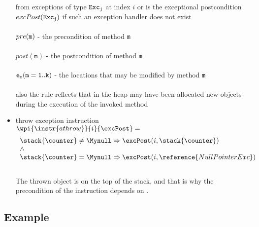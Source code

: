 \begin{itemize}
							from exceptions of type $\tt{Exc_j}$ at index $i$ or is the exceptional postcondition $excPost( \tt{Exc_j} )$ 
							if such an exception handler does not exist \\	\\
	 				 		$pre( \tt{m})$ - the precondition of method \texttt{m} \\ \\
	 				 		$ post( \texttt{m} )$ - the postcondition of method \texttt{m} \\ \\
	 				 		$\tt{e_m}( m =1 .. k  )  $ - the locations that may be modified by method  \texttt{m}  \\ \\
							also the rule reflects that in the heap may have been allocated new objects during the execution of the invoked method
						

\item throw exception instruction \\
				
							$ \wpi{\instr{athrow }} {i} {\excPost}  =$
							$$ \begin{array}{l} 
								\stack{\counter} \neq \Mynull \Rightarrow  \excPost( i, \stack{\counter}) \\
								\wedge \\
								\stack{\counter} = \Mynull \Rightarrow  \excPost( i, \reference{NullPointerExc}) \\
							   \end{array}
							$$ \\
						The thrown object is on the top of the stack, and that is why the precondition of the  instruction  
						depends on \stack{\counter}.
						
	 			
\end{itemize}



\subsection{Example}

